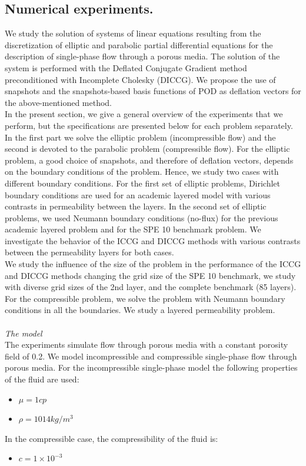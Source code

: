 \documentclass[12pt]{article}
\begin{document}
\subsection{Numerical experiments.}\label{numexp}
\hspace{0.5cm} We study the solution of systems of linear equations resulting from the discretization of elliptic and parabolic partial differential equations for the description of single-phase flow through a porous media. 
The solution of the system is performed with the Deflated Conjugate Gradient method preconditioned with Incomplete Cholesky (DICCG).
We propose the use of snapshots and the snapshots-based 
basis functions of POD as deflation vectors for the above-mentioned method.\\
In the present section, we give a general overview of the experiments that we perform, but the specifications
 are presented below for each problem separately. In the first part we solve the elliptic problem (incompressible flow) and the second is devoted to the parabolic problem (compressible flow).
 For the elliptic problem, a good choice of snapshots, and therefore of deflation vectors, depends on the boundary 
conditions of the problem. Hence, we study two cases with different boundary conditions. 
For the first set of elliptic problems, Dirichlet boundary conditions are used for 
an academic layered model with various contrasts in permeability between the layers. 
In the second set of elliptic problems, we used Neumann boundary conditions (no-flux) for the previous academic
layered problem and for the SPE 10 benchmark problem. 
We investigate the behavior of the ICCG and DICCG methods with various contrasts between the 
permeability layers for both cases. \\
We study the influence of the size of the problem in the performance of the ICCG and DICCG methods 
changing the grid size of the SPE 10 benchmark, we study with diverse grid sizes of the 2nd layer, and the complete benchmark (85 layers). \\
For the compressible problem, we solve the problem with Neumann boundary conditions in all the boundaries. We study a layered permeability problem.
\\ \\
\emph{The model}\\
The experiments simulate flow through porous media with a constant porosity field of 0.2.
We model incompressible and compressible single-phase flow through porous media.
For the incompressible single-phase model the following properties of the fluid are used:
\begin{itemize}
 \item $\mu = 1 cp$
 \item $\rho = 1014 kg/m^3$
\end{itemize}
In the compressible case, the compressibility of the fluid is:
\begin{itemize}
 \item $c= 1 \times 10^{-3}$
\end{itemize}
\end{document}
